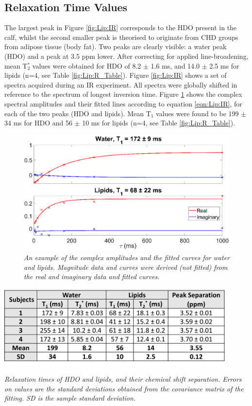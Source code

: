 \subsection{Relaxation Time Values}

The largest peak in Figure \ref{fig:Lip:IR} corresponds to the HDO present in the calf, whilst the second smaller peak is theorised to originate from CHD groups from adipose tissue (body fat). Two peaks are clearly visible: a water peak (\ac{HDO}) and a peak at 3.5 ppm lower. After correcting for applied line-broadening, mean T$_2^*$ values were obtained for \ac{HDO} of 8.2 $\pm$ 1.6 ms, and 14.0 $\pm$ 2.5 ms for lipids (n=4, see Table \ref{fig:Lip:R_Table}). Figure \ref{fig:Lip:IR} shows a set of spectra acquired during an \ac{IR} experiment. All spectra were globally shifted in reference to the spectrum of longest inversion time. Figure \ref{fig:Lip:Amp_Tau} shows the complex spectral amplitudes and their fitted lines according to equation \ref{eqn:Lip:IR}, for each of the two peaks (\ac{HDO} and lipids). Mean T$_1$ values were found to be 199 $\pm$ 34 ms for \ac{HDO} and 56 $\pm$ 10 ms for lipids (n=4, see Table \ref{fig:Lip:R_Table}).

\begin{figure}
    \centering
    \includegraphics[width=1\textwidth]{Figures/Lipid/Amp_Tau.png}
    \caption{\textit{An example of the complex amplitudes and the fitted curves for water and lipids. Magnitude data and curves were derived (not fitted) from the real and imaginary data and fitted curves.}}
    \label{fig:Lip:Amp_Tau}
\end{figure}

\begin{table}
    \centering
    \includegraphics[width=0.9\textwidth]{Figures/Lipid/Relaxation_Table.png}
    \caption{\textit{Relaxation times of \ac{HDO} and lipids, and their chemical shift separation. Errors on values are the standard deviations obtained from the covariance matrix of the fitting. SD is the sample standard deviation.}}
    \label{fig:Lip:R_Table}
\end{table}

